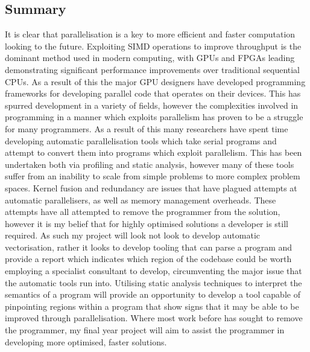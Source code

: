 \subsection{Summary}
It is clear that parallelisation is a key to more efficient and faster computation looking to the
future. Exploiting SIMD operations to improve throughput is the dominant method used in modern
computing, with GPUs and FPGAs leading demonstrating significant performance improvements over
traditional sequential CPUs. As a result of this the major GPU designers have developed programming
frameworks for developing parallel code that operates on their devices. This has spurred development
in a variety of fields, however the complexities involved in programming in a manner which exploits parallelism
has proven to be a struggle for many programmers. As a result of this many researchers have spent
time developing automatic parallelisation tools which take serial programs and attempt to convert
them into programs which exploit parallelism. This has been undertaken both via profiling and static
analysis, however many of these tools suffer from an inability to scale from simple problems to more
complex problem spaces. Kernel fusion and redundancy are issues that have plagued attempts at
automatic parallelisers, as well as memory management overheads. These attempts have all attempted
to remove the programmer from the solution, however it is my belief that for highly optimised
solutions a developer is still required. As such my project will look not look to develop automatic
vectorisation, rather it looks to develop tooling that can parse a program and provide a report
which indicates which region of the codebase could be worth employing a specialist consultant to
develop, circumventing the major issue that the automatic tools run into. Utilising static analysis
techniques to interpret the semantics of a program will provide an opportunity to develop a tool
capable of pinpointing regions within a program that show signs that it may be able to be improved
through parallelisation. Where most work before has sought to remove the programmer, my final year
project will aim to assist the programmer in developing more optimised, faster solutions.

